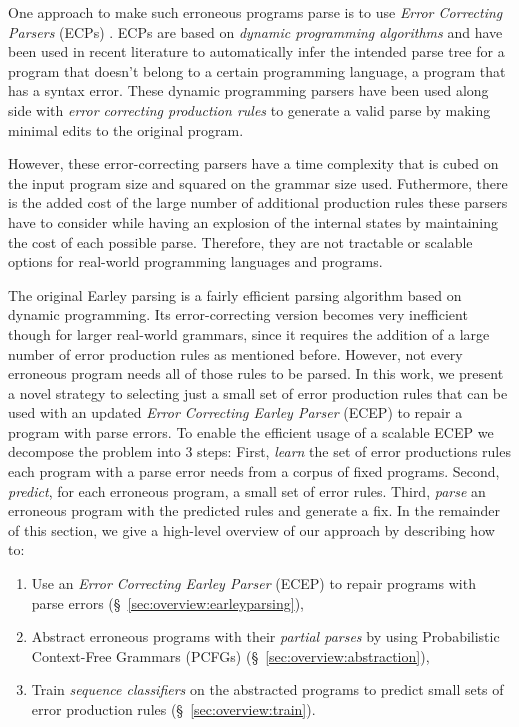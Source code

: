 One approach to make such erroneous programs parse is to use \emph{Error
Correcting Parsers} (ECPs) \citep{Aho_1972}. ECPs are based on \emph{dynamic
programming algorithms} and have been used in recent literature to automatically
infer the intended parse tree for a program that doesn't belong to a certain
programming language, \ie a program that has a syntax error. These dynamic
programming parsers have been used along side with \emph{error correcting
production rules} \citep{Aho_1972} to generate a valid parse by making minimal
edits to the original program.

However, these error-correcting parsers have a time complexity that is cubed on
the input program size and squared on the grammar size used. Futhermore, there
is the added cost of the large number of additional production rules these
parsers have to consider while having an explosion of the internal states by
maintaining the cost of each possible parse. Therefore, they are not tractable
or scalable options for real-world programming languages and programs.


The original Earley parsing is a fairly efficient parsing algorithm
\citep{Earley_1970} based on dynamic programming. Its error-correcting version
becomes very inefficient though for larger real-world grammars, since it
requires the addition of a large number of error production rules as mentioned
before. However, not every erroneous program needs all of those rules to be
parsed. In this work, we present a novel strategy to selecting just a small set
of error production rules that can be used with an updated \emph{Error
Correcting Earley Parser} (ECEP) to repair a program with parse errors.
%
To enable the efficient usage of a scalable ECEP we decompose the problem into 3
steps:
%
First, \emph{learn} the set of error productions rules each program with a parse
error needs from a corpus of fixed programs.
%
Second, \emph{predict}, for each erroneous program, a small set of error rules.
%
Third, \emph{parse} an erroneous program with the predicted rules and generate a
fix.
%
In the remainder of this section, we give a high-level overview
of our approach by describing how to:

\begin{enumerate}

  \item Use an \emph{Error Correcting Earley Parser} (ECEP) to repair programs
  with parse errors (\S~\ref{sec:overview:earleyparsing}),

  \item Abstract erroneous programs with their \emph{partial parses} by using
  Probabilistic Context-Free Grammars (PCFGs)
  (\S~\ref{sec:overview:abstraction}),

  \item Train \emph{sequence classifiers} on the abstracted programs to predict
  small sets of error production rules (\S~\ref{sec:overview:train}).

\end{enumerate}

